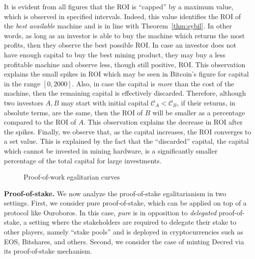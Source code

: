 It is evident from all figures that the ROI is ``capped'' by a maximum value,
which is observed in specified intervals. Indeed, this value identifies the
ROI of the \emph{best available} machine and is in line with Theorem~\ref{thm:sybil}. In other words, as long as an
investor is able to buy the machine which returns the most profits, then they
observe the best possible ROI. In case an investor does not have enough capital
to buy the best mining product, they may buy a less profitable machine and
observe less, though still positive, ROI. This observation explains the small
spikes in ROI which may be seen \eg in Bitcoin's figure for capital in the
range $[0, 2000]$. Also, in case the capital is \emph{more} than the cost of
the machine, then the remaining capital is effectively discarded. Therefore,
although two investors $A, B$ may start with initial capital $\mathcal{C}_A <
\mathcal{C}_B$, if their returns, in absolute terms, are the same, then the ROI
of $B$ will be smaller as a percentage compared to the ROI of $A$. This
observation explains the decrease in ROI after the spikes. Finally, we observe
that, as the capital increases, the ROI converges to a set value. This is
explained by the fact that the ``discarded'' capital, \ie the capital which
cannot be invested in mining hardware, is a significantly smaller percentage of
the total capital for large investments.

\begin{figure}
  \caption{Proof-of-work egalitarian curves}
  \label{fig:egalitarian_curves_pow}
\end{figure}

\noindent\textbf{Proof-of-stake.}
\noindent
We now analyze the proof-of-stake egalitarianism in two settings. First, we
consider pure proof-of-stake, which can be applied on top of a protocol like
Ouroboros. In this case, \emph{pure} is in opposition to \emph{delegated}
proof-of-stake, a setting where the stakeholders are required to delegate their
stake to other players, namely ``stake pools'' and is deployed in
cryptocurrencies such as EOS, Bitshares, and others. Second, we consider the
case of minting Decred via its proof-of-stake mechanism.


